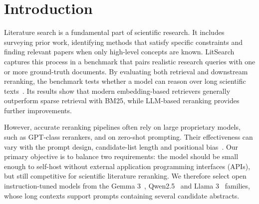 \documentclass[pdflatex,sn-basic,Numbered]{sn-jnl}%
\theoremstyle{thmstyleone}%
\theoremstyle{thmstyletwo}%
\theoremstyle{thmstylethree}%
\begin{document}

\maketitle

\section{Introduction}
\label{sec:introduction}
Literature search is a fundamental part of scientific research. It includes
surveying prior work, identifying methods that satisfy specific constraints and
finding relevant papers when only high-level concepts are known. LitSearch
captures this process in a benchmark that pairs realistic research queries with
one or more ground-truth documents. By evaluating both retrieval and downstream
reranking, the benchmark tests whether a model can reason over long scientific
texts~\cite{Ajith}. Its results show that modern embedding-based retrievers
generally outperform sparse retrieval with BM25, while LLM-based reranking
provides further improvements.

However, accurate reranking pipelines often rely on large proprietary models,
such as GPT-class rerankers, and on zero-shot prompting. Their effectiveness can
vary with the prompt design, candidate-list length and positional bias~\cite{Sun}.
Our primary objective is to balance two requirements: the model should be small
enough to self-host without external application programming interfaces (APIs), but still competitive for scientific
literature reranking. We therefore select open instruction-tuned models from
the Gemma 3~\cite{gemma3}, Qwen2.5~\cite{qwen25} and Llama 3~\cite{llama3}
families, whose long contexts support prompts containing several candidate abstracts.
\end{document}
